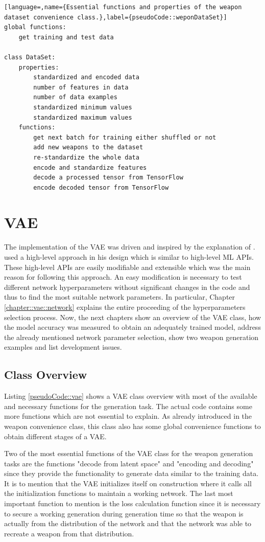 \documentclass[MGS,Master,english]{twbook}%
\begin{document}
\begin{lstlisting}[language=,name={Essential functions and properties of the weapon dataset convenience class.},label={pseudoCode::weponDataSet}]
global functions:
	get training and test data
	
class DataSet:
	properties:
		standardized and encoded data
		number of features in data
		number of data examples
		standardized minimum values
		standardized maximum values 
	functions:
		get next batch for training either shuffled or not
		add new weapons to the dataset
		re-standardize the whole data
		encode and standardize features
		decode a processed tensor from TensorFlow
		encode decoded tensor from TensorFlow
\end{lstlisting}

\section{\acl{VAE}}
The implementation of the \ac{VAE} was driven and inspired by the explanation of \citep{tutorial::vaeTF}.  used a high-level approach in his design which is similar to high-level \ac{ML} \acp{API}. These high-level \acp{API} are easily modifiable and extensible which was the main reason for following this approach. An easy modification is necessary to test different network hyperparameters without significant changes in the code and thus to find the most suitable network parameters. In particular, Chapter \ref{chapter::vae::network} explains the entire proceeding of the hyperparameters selection process. Now, the next chapters show an overview of the \ac{VAE} class, how the model accuracy was measured to obtain an adequately trained model, address the already mentioned network parameter selection, show two weapon generation examples and list development issues.

\subsection{Class Overview}
Listing \ref{pseudoCode::vae} shows a \ac{VAE} class overview with most of the available and necessary functions for the generation task. The actual code contains some more functions which are not essential to explain. As already introduced in the weapon convenience class, this class also has some global convenience functions to obtain different stages of a \ac{VAE}. 

Two of the most essential functions of the \ac{VAE} class for the weapon generation tasks are the functions "decode from latent space" and "encoding and decoding" since they provide the functionality to generate data similar to the training data. It is to mention that the \ac{VAE} initializes itself on construction where it calls all the initialization functions to maintain a working network. The last most important function to mention is the loss calculation function since it is necessary to secure a working generation during generation time so that the weapon is actually from the distribution of the network and that the network was able to recreate a weapon from that distribution.
\end{document}
